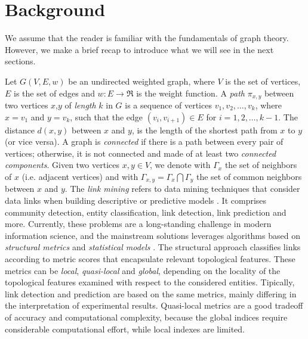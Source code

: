 \section{Background}
\label{sec:background}
We assume that the reader is familiar with the fundamentals of graph theory. 
However, we make a brief recap to introduce what we will see in the next sections.

Let $G(V,E,w)$ be an undirected weighted graph, where $V$ is the set of vertices, $E$ is the set of edges and $w:E\rightarrow\Re$ is the weight function. 
A \textit{path} $\pi_{x,y}$ between two vertices $x$,$y$ of \textit{length} $k$ in $G$ is a sequence of vertices $v_{1},v_{2},\ldots,v_{k}$, where $x = v_{1}$ and $y = v_{k}$, such that the edge $(v_{i},v_{i+1}) \in E$ for $i = 1, 2,\ldots,k-1$. 
The distance $d(x,y)$ between $x$ and $y$, is the length of the shortest path from $x$ to $y$ (or vice versa).
A graph is \textit{connected} if there is a path between every pair of vertices; otherwise, it is not connected and made of at least two \textit{connected components}.
Given two vertices $x,y \in V$, we denote with $\Gamma_{x}$ the set of neighbors of $x$ (i.e. adjacent vertices) and with $\Gamma_{x,y} = \Gamma_{x} \bigcap \Gamma_{y}$ the set of common neighbors between $x$ and $y$.
The \textit{link mining} refers to data mining techniques that consider data links when building descriptive or predictive models \cite{getoor2005link}. It comprises community detection, entity classification, link detection, link prediction and more. 
Currently, these problems are a long-standing challenge in modern information science, and the mainstream solutions leverages algorithms based on \textit{structural metrics} and \textit{statistical models} \cite{Liben-Nowell,Lu2011}.
The structural approach classifies links according to metric scores that encapsulate relevant topological features. 
These metrics can be \textit{local}, \textit{quasi-local} and \textit{global}, depending on the locality of the topological features examined with respect to the considered entities.
Tipically, link detection and prediction are based on the same metrics, mainly differing in the interpretation of experimental results.
Quasi-local metrics are a good tradeoff of accuracy and computational complexity, because the global indices require considerable computational effort, while local indexes are limited. 

